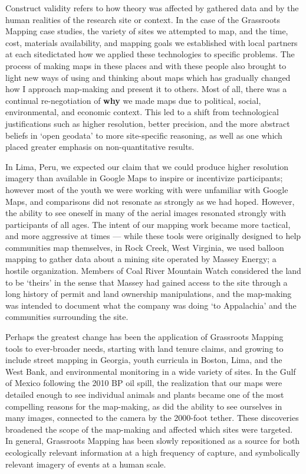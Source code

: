 \documentclass[11pt]{report}
\begin{document}
Construct validity refers to how theory was affected by gathered data and by the human realities of the research site or context. In the case of the Grassroots Mapping case studies, the variety of sites we attempted to map, and the time, cost, materials availability, and mapping goals we established with local partners at each sitedictated how we applied these technologies to specific problems. The process of making maps in these places and with these people also brought to light new ways of using and thinking about maps which has gradually changed how I approach map-making and present it to others. Most of all, there was a continual re-negotiation of \textbf{why} we made maps due to political, social, environmental, and economic context. This led to a shift from technological justifications such as higher resolution, better precision, and the more abstract beliefs in `open geodata' to more site-specific reasoning, as well as one which placed greater emphasis on non-quantitative results.  

In Lima, Peru, we expected our claim that we could produce higher resolution imagery than available in Google Maps to inspire or incentivize participants; however most of the youth we were working with were unfamiliar with Google Maps, and comparisons did not resonate as strongly as we had hoped. However, the ability to see oneself in many of the aerial images resonated strongly with participants of all ages. The intent of our mapping work became more tactical, and more aggressive at times --- while these tools were originally designed to help communities map themselves, in Rock Creek, West Virginia, we used balloon mapping to gather data about a mining site operated by Massey Energy; a hostile organization. Members of Coal River Mountain Watch considered the land to be `theirs' in the sense that Massey had gained access to the site through a long history of permit and land ownership manipulations, and the map-making was intended to document what the company was doing `to Appalachia' and the communities surrounding the site.

Perhaps the greatest change has been the application of Grassroots Mapping tools to ever-broader needs, starting with land tenure claims, and growing to include street mapping in Georgia, youth curricula in Boston, Lima, and the West Bank, and environmental monitoring in a wide variety of sites. In the Gulf of Mexico following the 2010 BP oil spill, the realization that our maps were detailed enough to see individual animals and plants became one of the most compelling reasons for the map-making, as did the ability to see ourselves in many images, connected to the camera by the 2000-foot tether. These discoveries broadened the scope of the map-making and affected which sites were targeted. In general, Grassroots Mapping has been slowly repositioned as a source for both ecologically relevant information at a high frequency of capture, and symbolically relevant imagery of events at a human scale.
\end{document}
